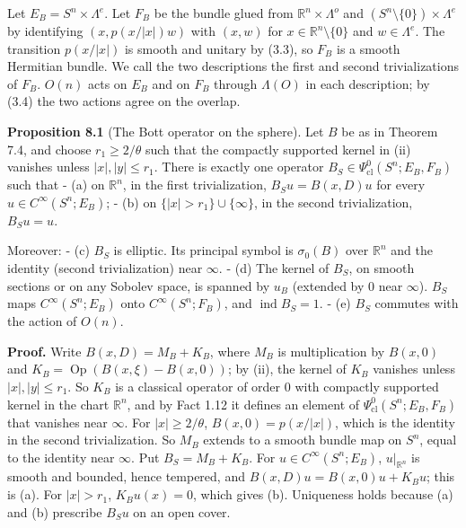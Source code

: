 \documentclass[
  11pt,
]{article}
\begin{document}
Let \(E_B=S^n\times\Lambda^e\). Let \(F_B\) be the bundle glued from
\(\mathbb R^n\times\Lambda^o\) and
\((S^n\setminus\{0\})\times\Lambda^e\) by identifying \((x,p(x/|x|)w)\)
with \((x,w)\) for \(x\in\mathbb R^n\setminus\{0\}\) and
\(w\in\Lambda^e\). The transition \(p(x/|x|)\) is smooth and unitary by
(3.3), so \(F_B\) is a smooth Hermitian bundle. We call the two
descriptions the first and second trivializations of \(F_B\). \(O(n)\)
acts on \(E_B\) and on \(F_B\) through \(\Lambda(O)\) in each
description; by (3.4) the two actions agree on the overlap.

\textbf{Proposition 8.1} (The Bott operator on the sphere). Let \(B\) be
as in Theorem 7.4, and choose \(r_1\ge2/\theta\) such that the compactly
supported kernel in (ii) vanishes unless \(|x|,|y|\le r_1\). There is
exactly one operator \(B_S\in\Psi^0_{\mathrm{cl}}(S^n;E_B,F_B)\) such
that - (a) on \(\mathbb R^n\), in the first trivialization,
\(B_Su=B(x,D)u\) for every \(u\in C^\infty(S^n;E_B)\); - (b) on
\(\{|x|>r_1\}\cup\{\infty\}\), in the second trivialization, \(B_Su=u\).

Moreover: - (c) \(B_S\) is elliptic. Its principal symbol is
\(\sigma_0(B)\) over \(\mathbb R^n\) and the identity (second
trivialization) near \(\infty\). - (d) The kernel of \(B_S\), on smooth
sections or on any Sobolev space, is spanned by \(u_B\) (extended by
\(0\) near \(\infty\)). \(B_S\) maps \(C^\infty(S^n;E_B)\) onto
\(C^\infty(S^n;F_B)\), and \(\operatorname{ind}B_S=1\). - (e) \(B_S\)
commutes with the action of \(O(n)\).

\textbf{Proof.} Write \(B(x,D)=M_B+K_B\), where \(M_B\) is
multiplication by \(B(x,0)\) and
\(K_B=\operatorname{Op}(B(x,\xi)-B(x,0))\); by (ii), the kernel of
\(K_B\) vanishes unless \(|x|,|y|\le r_1\). So \(K_B\) is a classical
operator of order \(0\) with compactly supported kernel in the chart
\(\mathbb R^n\), and by Fact 1.12 it defines an element of
\(\Psi^0_{\mathrm{cl}}(S^n;E_B,F_B)\) that vanishes near \(\infty\). For
\(|x|\ge2/\theta\), \(B(x,0)=p(x/|x|)\), which is the identity in the
second trivialization. So \(M_B\) extends to a smooth bundle map on
\(S^n\), equal to the identity near \(\infty\). Put \(B_S=M_B+K_B\). For
\(u\in C^\infty(S^n;E_B)\), \(u|_{\mathbb R^n}\) is smooth and bounded,
hence tempered, and \(B(x,D)u=B(x,0)u+K_Bu\); this is (a). For
\(|x|>r_1\), \(K_Bu(x)=0\), which gives (b). Uniqueness holds because
(a) and (b) prescribe \(B_Su\) on an open cover.
\end{document}
